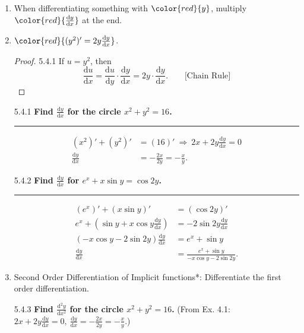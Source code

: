 \documentclass[12pt, a4paper]{article}
\begin{document}
\begin{enumerate}
    \item When differentiating something with $\color{red}{y}$, multiply $\color{red}{\frac{\mathrm{d}y}{\mathrm{d}x}}$ at the end. 
    \item $\color{red}{(y^2)'=2y\frac{\mathrm{d}y}{\mathrm{d}x}}$.
    \begin{proof}{5.4.1}{}
        If $u=y^2$, then 
        $$\frac{\mathrm{d}u}{\mathrm{d}x}=\frac{\mathrm{d}u}{\mathrm{d}y}\cdot\frac{\mathrm{d}y}{\mathrm{d}x}=2y\cdot\frac{\mathrm{d}y}{\mathrm{d}x}.\ \ \ \ \ \ \ \ \ \text{[Chain Rule]}$$
    \end{proof}
    \begin{example}{5.4.1}{}
        \textbf{Find $\frac{\mathrm{d}y}{\mathrm{d}x}$ for the circle $x^2+y^2=16$.}\\
        \noindent\rule[0.1pt]{\textwidth}{1pt}
        $$\begin{aligned}
            (x^2)'+(y^2)'&=(16)'\ \Rightarrow\ 2x+2y\frac{\mathrm{d}y}{\mathrm{d}x}=0\\
            \frac{\mathrm{d}y}{\mathrm{d}x}&=-\frac{2x}{2y}=-\frac{x}{y}.
        \end{aligned}$$
    \end{example}
    \begin{example}{5.4.2}{}
        \textbf{Find $\frac{\mathrm{d}y}{\mathrm{d}x}$ for $e^x+x\sin y=\cos 2y$.}\\
        \noindent\rule[0.1pt]{\textwidth}{1pt}
        $$\begin{aligned}
            (e^x)'+(x\sin y)'&=(\cos 2y)'\\
            e^x+\left(\sin y+x\cos y\frac{\mathrm{d}y}{\mathrm{d}x}\right)&=-2\sin 2y\frac{\mathrm{d}y}{\mathrm{d}x}\\
            (-x\cos y-2\sin 2y)\frac{\mathrm{d}y}{\mathrm{d}x}&=e^x+\sin y\\
            \frac{\mathrm{d}y}{\mathrm{d}x}&=\frac{e^x+\sin y}{-x\cos y-2\sin 2y}.
        \end{aligned}$$
    \end{example}
    \item Second Order Differentiation of Implicit functions*: Differentiate the first order differentiation.
    \begin{example}{5.4.3}{}
        \textbf{Find $\frac{\mathrm{d}^2y}{\mathrm{d}x^2}$ for the circle $x^2+y^2=16$.} (From Ex. 4.1: $2x+2y\frac{\mathrm{d}y}{\mathrm{d}x}=0,\ \frac{\mathrm{d}y}{\mathrm{d}x}=-\frac{2x}{2y}=-\frac{x}{y}.$)\\

\end{example}
\end{enumerate}
\end{document}
